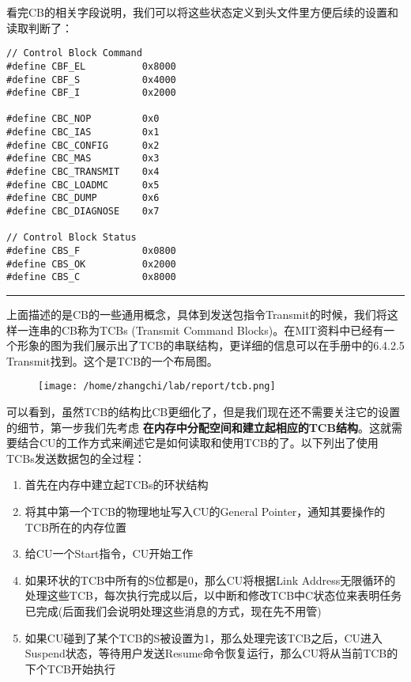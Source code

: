 \documentclass{article}
\newcommand{\highlight}[1]{{\bfseries \color{red}  #1}}
\begin{document}
\begin{CJK*}{UTF8}{gkai}
看完CB的相关字段说明，我们可以将这些状态定义到头文件里方便后续的设置和读取判断了：

\begin{lstlisting}[style=ccode, title={\scriptsize \ttfamily \bfseries kern/e100.h}]
// Control Block Command
#define CBF_EL          0x8000
#define CBF_S           0x4000
#define CBF_I           0x2000

#define CBC_NOP         0x0
#define CBC_IAS         0x1
#define CBC_CONFIG      0x2
#define CBC_MAS         0x3
#define CBC_TRANSMIT    0x4
#define CBC_LOADMC      0x5
#define CBC_DUMP        0x6
#define CBC_DIAGNOSE    0x7

// Control Block Status
#define CBS_F           0x0800
#define CBS_OK          0x2000
#define CBS_C           0x8000
\end{lstlisting}

\vspace{2em}
\hrule
\vspace{2em}


上面描述的是CB的一些通用概念，具体到发送包指令Transmit的时候，我们将这样一连串的CB称为TCBs (Transmit Command Blocks)。在MIT资料中已经有一个形象的图为我们展示出了TCB的串联结构，更详细的信息可以在手册中的6.4.2.5 Transmit找到。这个是TCB的一个布局图。

\begin{figure}[htp]
\centering
\texttt{[image: /home/zhangchi/lab/report/tcb.png]}
\end{figure}

可以看到，虽然TCB的结构比CB更细化了，但是我们现在还不需要关注它的设置的细节，第一步我们先考虑\highlight{在内存中分配空间和建立起相应的TCB结构}。这就需要结合CU的工作方式来阐述它是如何读取和使用TCB的了。以下列出了使用TCBs发送数据包的全过程：

\begin{enumerate}
\item{首先在内存中建立起TCBs的环状结构}
\item{将其中第一个TCB的物理地址写入CU的General Pointer，通知其要操作的TCB所在的内存位置}
\item{给CU一个Start指令，CU开始工作}
\item{如果环状的TCB中所有的S位都是0，那么CU将根据Link Address无限循环的处理这些TCB，每次执行完成以后，以中断和修改TCB中C状态位来表明任务已完成(后面我们会说明处理这些消息的方式，现在先不用管)}
\item{如果CU碰到了某个TCB的S被设置为1，那么处理完该TCB之后，CU进入Suspend状态，等待用户发送Resume命令恢复运行，那么CU将从当前TCB的下个TCB开始执行}
\end{enumerate}



\end{CJK*}
\end{document}
